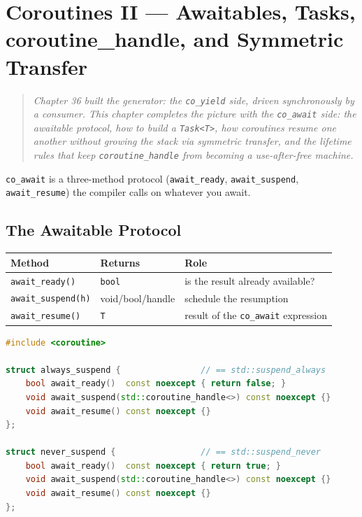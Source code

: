 \chapter{Coroutines II --- Awaitables, Tasks, coroutine\_handle, and Symmetric Transfer}
\label{ch:c20-coroutines-ii}

\begin{quote}
\emph{Chapter 36 built the generator: the \texttt{co\_yield} side, driven synchronously by a consumer. This chapter completes the picture with the \texttt{co\_await} side: the awaitable protocol, how to build a \texttt{Task<T>}, how coroutines resume one another without growing the stack via symmetric transfer, and the lifetime rules that keep \texttt{coroutine\_handle} from becoming a use-after-free machine.}
\end{quote}

\texttt{co\_await} is a three-method protocol (\texttt{await\_ready}, \texttt{await\_suspend}, \texttt{await\_resume}) the compiler calls on whatever you await.

\section{The Awaitable Protocol}
\label{sec:c20-awaitable-protocol}

\begin{center}
\begin{tabular}{lll}
\hline
\textbf{Method} & \textbf{Returns} & \textbf{Role} \\
\hline
\texttt{await\_ready()} & \texttt{bool} & is the result already available? \\
\texttt{await\_suspend(h)} & void/bool/handle & schedule the resumption \\
\texttt{await\_resume()} & \texttt{T} & result of the \texttt{co\_await} expression \\
\hline
\end{tabular}
\end{center}

\begin{lstlisting}[language=C++,caption={The two trivial awaiters reveal the protocol}]
#include <coroutine>

struct always_suspend {                // == std::suspend_always
    bool await_ready()  const noexcept { return false; }
    void await_suspend(std::coroutine_handle<>) const noexcept {}
    void await_resume() const noexcept {}
};

struct never_suspend {                 // == std::suspend_never
    bool await_ready()  const noexcept { return true; }
    void await_suspend(std::coroutine_handle<>) const noexcept {}
    void await_resume() const noexcept {}
};
\end{lstlisting}

